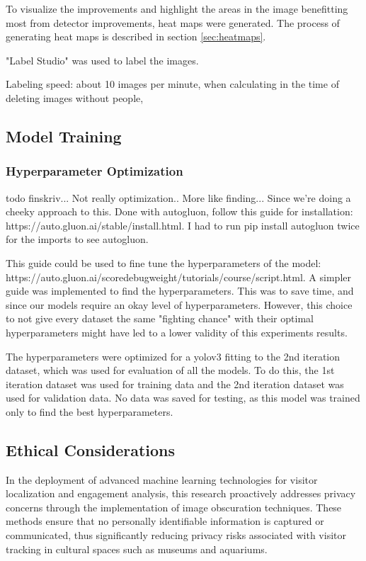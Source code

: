 To visualize the improvements and highlight the areas in the image benefitting most from detector improvements, heat maps were generated. The process of generating heat maps is described in section \ref{sec:heatmaps}.


"Label Studio" was used to label the images. 

Labeling speed: about 10 images per minute, when calculating in the time of deleting images without people,

\subsection{Model Training}
\label{sec:model_training}

\subsubsection{Hyperparameter Optimization}
todo finskriv... Not really optimization.. More like finding... Since we're doing a cheeky approach to this. Done with autogluon, follow this guide for installation: https://auto.gluon.ai/stable/install.html. I had to run pip install autogluon twice for the imports to see autogluon.

This guide could be used to fine tune the hyperparameters of the model: https://auto.gluon.ai/scoredebugweight/tutorials/course/script.html. A simpler guide was implemented to find the hyperparameters. This was to save time, and since our models require an okay level of hyperparameters. However, this choice to not give every dataset the same "fighting chance" with their optimal hyperparameters might have led to a lower validity of this experiments results. 

The hyperparameters were optimized for a yolov3 fitting to the 2nd iteration dataset, which was used for evaluation of all the models. To do this, the 1st iteration dataset was used for training data and the 2nd iteration dataset was used for validation data. No data was saved for testing, as this model was trained only to find the best hyperparameters.


\subsection{Ethical Considerations}
In the deployment of advanced machine learning technologies for visitor localization and engagement analysis, this research proactively addresses privacy concerns through the implementation of image obscuration techniques. These methods ensure that no personally identifiable information is captured or communicated, thus significantly reducing privacy risks associated with visitor tracking in cultural spaces such as museums and aquariums.

